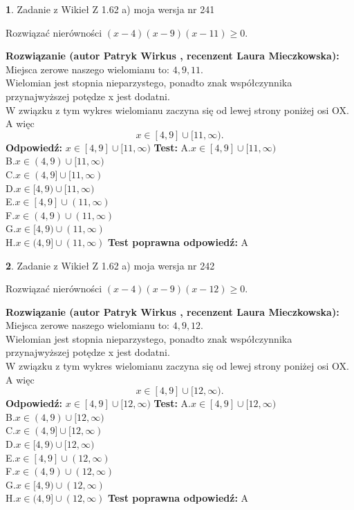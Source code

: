 \documentclass[12pt, a4paper]{article}
\theoremstyle{definition} %
\newtheorem{zad}{}
\newcommand{\zadStart}[1]{\begin{zad}#1\newline}
\newcommand{\zadStop}{\end{zad}}
\newcommand{\rozwStart}[2]{\noindent \textbf{Rozwiązanie (autor #1 , recenzent #2): }\newline}
\newcommand{\rozwStop}{\newline}
\newcommand{\odpStart}{\noindent \textbf{Odpowiedź:}\newline}
\newcommand{\odpStop}{\newline}
\newcommand{\testStart}{\noindent \textbf{Test:}\newline}
\newcommand{\testStop}{\newline}
\newcommand{\kluczStart}{\noindent \textbf{Test poprawna odpowiedź:}\newline}
\newcommand{\kluczStop}{\newline}
\begin{document}
\zadStart{Zadanie z Wikieł Z 1.62 a) moja wersja nr 241}

Rozwiązać nierówności $(x-4)(x-9)(x-11)\ge0$.
\zadStop
\rozwStart{Patryk Wirkus}{Laura Mieczkowska}
Miejsca zerowe naszego wielomianu to: $4, 9, 11$.\\
Wielomian jest stopnia nieparzystego, ponadto znak współczynnika przy\linebreak najwyższej potędze x jest dodatni.\\ W związku z tym wykres wielomianu zaczyna się od lewej strony poniżej osi OX. A więc $$x \in [4,9] \cup [11,\infty).$$
\rozwStop
\odpStart
$x \in [4,9] \cup [11,\infty)$
\odpStop
\testStart
A.$x \in [4,9] \cup [11,\infty)$\\
B.$x \in (4,9) \cup [11,\infty)$\\
C.$x \in (4,9] \cup [11,\infty)$\\
D.$x \in [4,9) \cup [11,\infty)$\\
E.$x \in [4,9] \cup (11,\infty)$\\
F.$x \in (4,9) \cup (11,\infty)$\\
G.$x \in [4,9) \cup (11,\infty)$\\
H.$x \in (4,9] \cup (11,\infty)$
\testStop
\kluczStart
A
\kluczStop



\zadStart{Zadanie z Wikieł Z 1.62 a) moja wersja nr 242}

Rozwiązać nierówności $(x-4)(x-9)(x-12)\ge0$.
\zadStop
\rozwStart{Patryk Wirkus}{Laura Mieczkowska}
Miejsca zerowe naszego wielomianu to: $4, 9, 12$.\\
Wielomian jest stopnia nieparzystego, ponadto znak współczynnika przy\linebreak najwyższej potędze x jest dodatni.\\ W związku z tym wykres wielomianu zaczyna się od lewej strony poniżej osi OX. A więc $$x \in [4,9] \cup [12,\infty).$$
\rozwStop
\odpStart
$x \in [4,9] \cup [12,\infty)$
\odpStop
\testStart
A.$x \in [4,9] \cup [12,\infty)$\\
B.$x \in (4,9) \cup [12,\infty)$\\
C.$x \in (4,9] \cup [12,\infty)$\\
D.$x \in [4,9) \cup [12,\infty)$\\
E.$x \in [4,9] \cup (12,\infty)$\\
F.$x \in (4,9) \cup (12,\infty)$\\
G.$x \in [4,9) \cup (12,\infty)$\\
H.$x \in (4,9] \cup (12,\infty)$
\testStop
\kluczStart
A
\kluczStop
\end{document}

